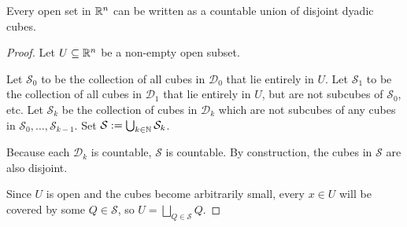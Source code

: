 \begin{lem}[] \label{lem:open-dyadic}
  Every open set in $\mathbb{R}^{n}$ can be written as a countable union of disjoint dyadic cubes.
\end{lem}
\begin{proof}
Let $U \subseteq \mathbb{R}^{n}$ be a non-empty open subset.

Let $\mathcal{S}_0$ to be the collection of all cubes in $\mathcal{D}_0$ that lie entirely in $U$.
Let $\mathcal{S}_1$ to be the collection of all cubes in $\mathcal{D}_1$ that lie entirely in $U$, but are not subcubes of $\mathcal{S}_0$, etc.
Let $\mathcal{S}_k$ be the collection of cubes in $\mathcal{D}_k$ which are not subcubes of any cubes in $\mathcal{S}_0, \ldots, \mathcal{S}_{k-1}$.
Set $\mathcal{S} := \bigcup_{k \in \mathbb{N}}\mathcal{S}_k$.

Because each $\mathcal{D}_k$ is countable, $\mathcal{S}$ is countable.
By construction, the cubes in $\mathcal{S}$ are also disjoint.

Since $U$ is open and the cubes become arbitrarily small, every $x \in U$ will be covered by some $Q \in \mathcal{S}$, so $U = \bigsqcup_{Q \in \mathcal{S}}Q$.

\end{proof}

